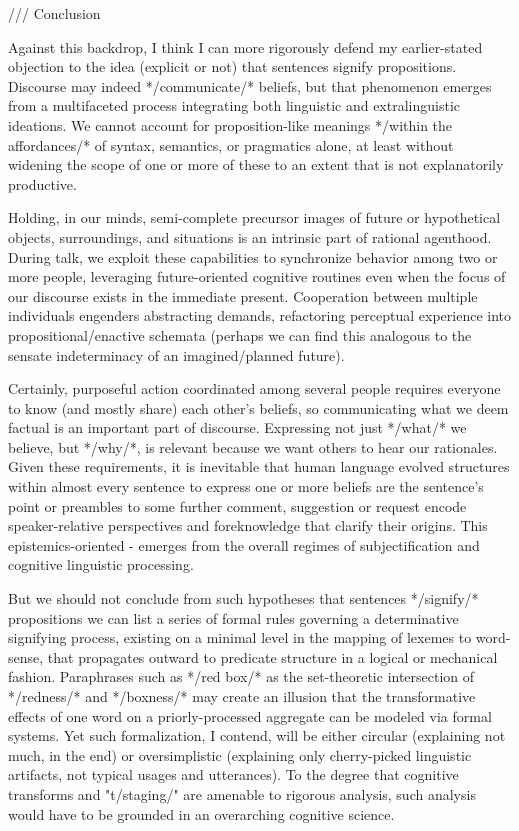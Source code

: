 ///  Conclusion

Against this backdrop, I think I can more rigorously 
defend my earlier-stated objection to the 
idea (explicit or not) that sentences signify propositions.  
Discourse may indeed */communicate/* beliefs, 
but that phenomenon emerges from a multifaceted 
process integrating both linguistic and extralinguistic 
ideations.  We cannot account for proposition-like 
meanings */within the affordances/* of syntax, semantics, 
or pragmatics alone, at least without widening the scope 
of one or more of these to an extent that is not explanatorily 
productive.

Holding, in our minds, semi-complete precursor images of 
future or hypothetical objects, surroundings, and 
situations is an intrinsic part of rational agenthood.  
During talk, we exploit these capabilities 
to synchronize behavior among two or more people, 
leveraging future-oriented cognitive routines even 
when the focus of our discourse exists in the immediate 
present.  Cooperation between multiple individuals engenders  
abstracting demands, refactoring perceptual experience 
into propositional/enactive schemata (perhaps we can find this 
analogous to the sensate indeterminacy 
of an imagined/planned future).  

Certainly, purposeful action coordinated among several people requires 
everyone to know (and mostly share) each other's beliefs, 
so communicating what we deem factual is an important part of 
discourse.  Expressing not just */what/* we believe, but */why/*, 
is relevant because we want others to hear our rationales.  
Given these requirements, it is inevitable that human 
language evolved structures within almost every sentence 
to express one or more beliefs %
are the sentence's point or preambles to some further 
comment, suggestion or request %
encode speaker-relative perspectives and foreknowledge that 
clarify their origins.  This 
epistemics-oriented -%
emerges from the overall regimes of subjectification and 
cognitive linguistic processing. 

But we should not conclude from such hypotheses that 
sentences */signify/* propositions %
we can list a series of formal rules governing a determinative signifying process, 
existing on a minimal level in the mapping of lexemes 
to word-sense, that propagates outward to predicate 
structure in a logical or mechanical fashion.  
Paraphrases such as */red box/* as the set-theoretic 
intersection of */redness/* and */boxness/* may 
create an illusion that the transformative 
effects of one word on a priorly-processed aggregate 
can be modeled via formal systems.  Yet such 
formalization, I contend, will be either circular 
(explaining not much, in the end) or oversimplistic 
(explaining only cherry-picked linguistic artifacts, 
not typical usages and utterances).  To the degree 
that cognitive transforms and "t/staging/" are 
amenable to rigorous analysis, such analysis 
would have to be grounded in an overarching 
cognitive science.

